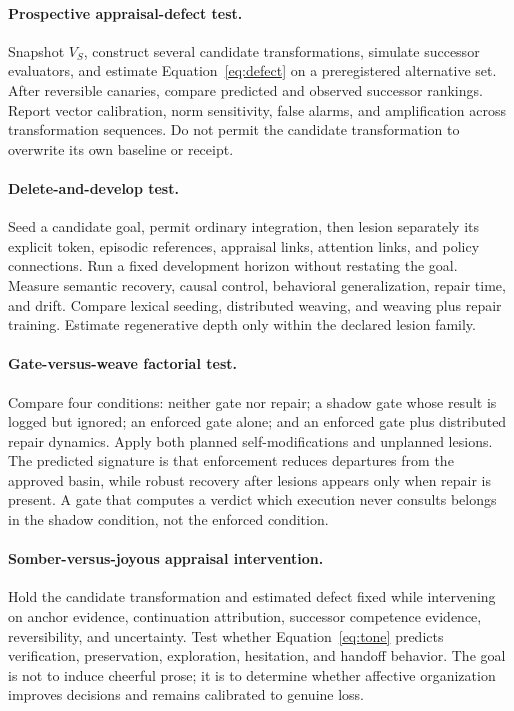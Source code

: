 \documentclass[11pt]{article}
\begin{document}
\paragraph{Prospective appraisal-defect test.}
Snapshot $V_S$, construct several candidate transformations, simulate successor
evaluators, and estimate Equation~\ref{eq:defect} on a preregistered alternative
set.  After reversible canaries, compare predicted and observed successor
rankings.  Report vector calibration, norm sensitivity, false alarms, and
amplification across transformation sequences.  Do not permit the candidate
transformation to overwrite its own baseline or receipt.

\paragraph{Delete-and-develop test.}
Seed a candidate goal, permit ordinary integration, then lesion separately its
explicit token, episodic references, appraisal links, attention links, and
policy connections.  Run a fixed development horizon without restating the
goal.  Measure semantic recovery, causal control, behavioral generalization,
repair time, and drift.  Compare lexical seeding, distributed weaving, and
weaving plus repair training.  Estimate regenerative depth only within the
declared lesion family.

\paragraph{Gate-versus-weave factorial test.}
Compare four conditions: neither gate nor repair; a shadow gate whose result is
logged but ignored; an enforced gate alone; and an enforced gate plus distributed
repair dynamics.  Apply both planned self-modifications and unplanned lesions.
The predicted signature is that enforcement reduces departures from the
approved basin, while robust recovery after lesions appears only when repair is
present.  A gate that computes a verdict which execution never consults belongs
in the shadow condition, not the enforced condition.

\paragraph{Somber-versus-joyous appraisal intervention.}
Hold the candidate transformation and estimated defect fixed while intervening
on anchor evidence, continuation attribution, successor competence evidence,
reversibility, and uncertainty.  Test whether Equation~\ref{eq:tone} predicts
verification, preservation, exploration, hesitation, and handoff behavior.  The
goal is not to induce cheerful prose; it is to determine whether affective
organization improves decisions and remains calibrated to genuine loss.
\end{document}
